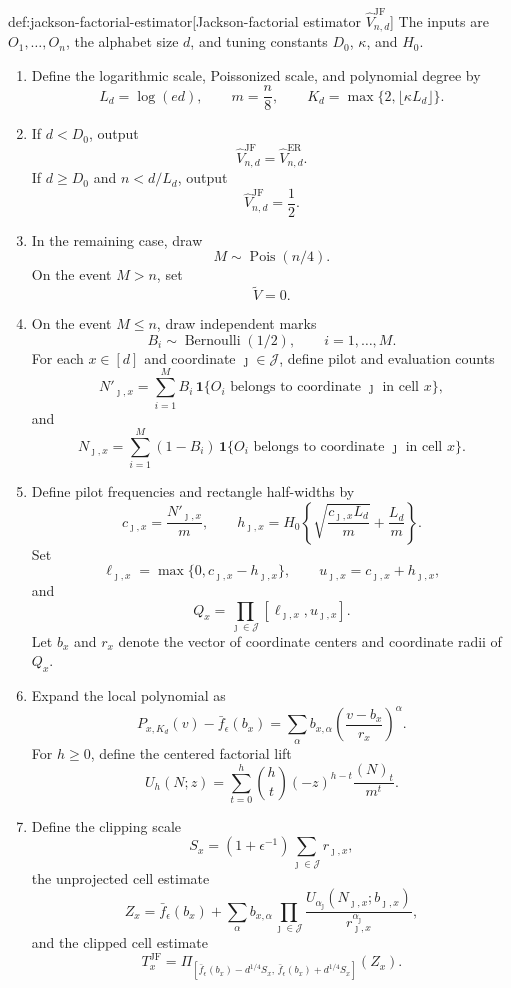\begin{algorithmv}{def:jackson-factorial-estimator}[Jackson-factorial estimator \(\widehat V_{n,d}^{\mathrm{JF}}\)]
The inputs are \(O_1,\ldots,O_n\), the alphabet size \(d\), and tuning constants \(D_0\), \(\kappa\), and \(H_0\).

\begin{enumerate}
\item Define the logarithmic scale, Poissonized scale, and polynomial degree by
\[
L_d=\log(ed),
\qquad
m=\frac n8,
\qquad
K_d=\max\{2,\lfloor \kappa L_d\rfloor\}.
\]

\item If \(d<D_0\), output
\[
\widehat V_{n,d}^{\mathrm{JF}}
=
\widehat V_{n,d}^{\mathrm{ER}}.
\]
If \(d\ge D_0\) and \(n<d/L_d\), output
\[
\widehat V_{n,d}^{\mathrm{JF}}
=
\frac12.
\]

\item In the remaining case, draw
\[
M\sim\operatorname{Pois}(n/4).
\]
On the event \(M>n\), set
\[
\widetilde V=0.
\]

\item On the event \(M\le n\), draw independent marks
\[
B_i\sim\operatorname{Bernoulli}(1/2),
\qquad i=1,\ldots,M.
\]
For each \(x\in[d]\) and coordinate \(\jmath\in\mathcal J\), define pilot and evaluation counts
\[
N'_{\jmath,x}
=
\sum_{i=1}^M B_i\,\mathbf 1\{O_i\text{ belongs to coordinate }\jmath\text{ in cell }x\},
\]
and
\[
N_{\jmath,x}
=
\sum_{i=1}^M (1-B_i)\,\mathbf 1\{O_i\text{ belongs to coordinate }\jmath\text{ in cell }x\}.
\]

\item Define pilot frequencies and rectangle half-widths by
\[
c_{\jmath,x}
=
\frac{N'_{\jmath,x}}{m},
\qquad
h_{\jmath,x}
=
H_0
\left\{
\sqrt{\frac{c_{\jmath,x}L_d}{m}}
+
\frac{L_d}{m}
\right\}.
\]
Set
\[
\ell_{\jmath,x}
=
\max\{0,c_{\jmath,x}-h_{\jmath,x}\},
\qquad
u_{\jmath,x}
=
c_{\jmath,x}+h_{\jmath,x},
\]
and
\[
Q_x
=
\prod_{\jmath\in\mathcal J}
[\ell_{\jmath,x},u_{\jmath,x}].
\]
Let \(b_x\) and \(r_x\) denote the vector of coordinate centers and coordinate radii of \(Q_x\).

\item Expand the local polynomial as
\[
P_{x,K_d}(v)-\bar f_\epsilon(b_x)
=
\sum_\alpha
b_{x,\alpha}
\left(\frac{v-b_x}{r_x}\right)^\alpha .
\]
For \(h\ge 0\), define the centered factorial lift
\[
U_h(N;z)
=
\sum_{t=0}^h
\binom ht
(-z)^{h-t}
\frac{(N)_t}{m^t}.
\]

\item Define the clipping scale
\[
S_x
=
(1+\epsilon^{-1})
\sum_{\jmath\in\mathcal J} r_{\jmath,x},
\]
the unprojected cell estimate
\[
Z_x
=
\bar f_\epsilon(b_x)
+
\sum_\alpha
b_{x,\alpha}
\prod_{\jmath\in\mathcal J}
\frac{
U_{\alpha_{\jmath}}(N_{\jmath,x};b_{\jmath,x})
}{
r_{\jmath,x}^{\alpha_{\jmath}}
},
\]
and the clipped cell estimate
\[
T_x^{\mathrm{JF}}
=
\Pi_{
[\bar f_\epsilon(b_x)-d^{1/4}S_x,\,
 \bar f_\epsilon(b_x)+d^{1/4}S_x]
}
(Z_x).
\]


\end{enumerate}
\end{algorithmv}
